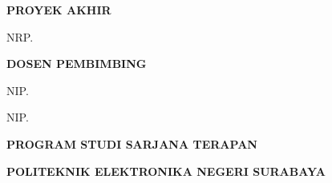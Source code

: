 \newpage
\thispagestyle{empty}

\begin{flushright}
  {\fontsize{20}{0}\bfseries\selectfont PROYEK AKHIR\par}
\end{flushright}

\vspace{1.5cm}

\begin{center}

  \begin{minipage}{1\textwidth}
    \centering
    \fontsize{18}{20}\bfseries\selectfont\MakeUppercase{\JudulPA}
  \end{minipage}
  \par

  \vspace{1.5cm}

  {\fontsize{16}{20}\bfseries\selectfont
    \NamaMahasiswa\par
  NRP. \NRP\par}

  \vspace{1.2cm}

  {\fontsize{16}{20}\bfseries\selectfont DOSEN PEMBIMBING\par}

  \vspace{0.4cm}

  {\fontsize{16}{20}\selectfont
    \NamaPembimbingSatu\par
  NIP. \NIPPembimbingSatu\par}

  \vspace{0.4cm}

  {\fontsize{16}{20}\selectfont
    \NamaPembimbingDua\par
  NIP. \NIPPembimbingDua\par}

  \vspace{2cm}

  {\fontsize{16}{20}\bfseries\selectfont
    PROGRAM STUDI SARJANA TERAPAN\par
    \MakeUppercase{\NamaProdi}\par
  \MakeUppercase{\NamaDepartemen}\par}

  \vspace{0.8cm}

  {\fontsize{16}{20}\bfseries\selectfont
    POLITEKNIK ELEKTRONIKA NEGERI SURABAYA\par
  \TahunLulus\par}

\end{center}